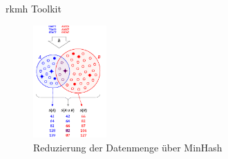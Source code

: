 

\begin{frame}{rkmh Toolkit}
    \begin{figure}[H]
        \centering
        \includegraphics[width=0.25\textwidth]{images/mash_similarity.png} 
        \caption{Reduzierung der Datenmenge über MinHash \cite{mashSimilarityImage}}
    \end{figure}
\end{frame}